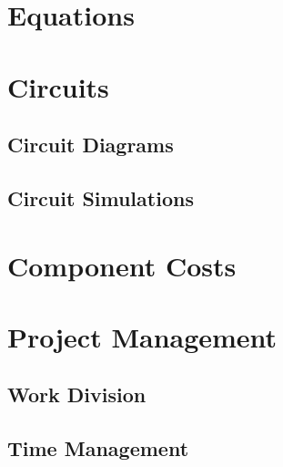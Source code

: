 \documentclass{TechReport}
\begin{document}
\appendix
\section{Equations}
\label{app:equations}

\section{Circuits}
\label{app:Circuits}

\subsection{Circuit Diagrams}

\subsection{Circuit Simulations}

\section{Component Costs}
\label{app:costs}

\section{Project Management}
\subsection{Work Division}
\subsection{Time Management}
\end{document}

